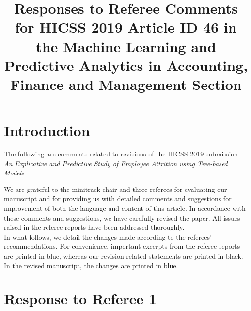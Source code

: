 \documentclass{amsart}[12pt]
\title{Responses to Referee Comments for HICSS 2019 Article ID 46 in the Machine Learning and 
Predictive Analytics in Accounting, Finance and Management Section}
\begin{document}
\maketitle

\section{Introduction}

The following are comments related to revisions of the HICSS 2019 submission \emph{An 
Explicative and Predictive Study of Employee Attrition using Tree-based Models} 

\indent
We are grateful to the minitrack chair and three referees for evaluating our
manuscript and for providing us with detailed comments and suggestions for improvement of both 
the language and content of this article. In
accordance with these comments and suggestions, we have carefully revised
the paper. All issues raised in the referee reports have been addressed thoroughly.\\
\indent In what follows, we detail the changes made according to the referees'
recommendations. For convenience, important excerpts from the referee reports are printed in blue,
whereas our revision related statements are
printed in black. In the revised manuscript, the changes are printed in blue.\\




\section{Response to Referee 1}
\end{document}
